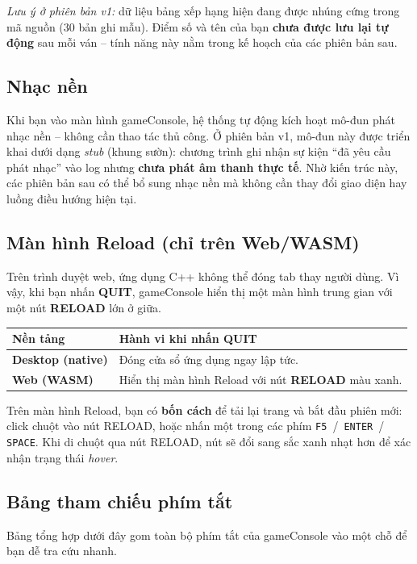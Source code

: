 \documentclass[12pt,a4paper]{article}
\begin{document}
\vspace{4pt}
\noindent\textit{Lưu ý ở phiên bản v1:} dữ liệu bảng xếp hạng hiện đang được nhúng cứng trong mã nguồn (30 bản ghi mẫu).
Điểm số và tên của bạn \textbf{chưa được lưu lại tự động} sau mỗi ván -- tính năng này nằm trong kế hoạch của các phiên bản sau.

\subsection{Nhạc nền}
Khi bạn vào màn hình gameConsole, hệ thống tự động kích hoạt mô-đun phát nhạc nền -- không cần thao tác thủ công.
Ở phiên bản v1, mô-đun này được triển khai dưới dạng \textit{stub} (khung sườn): chương trình ghi nhận sự kiện ``đã yêu cầu phát nhạc'' vào log nhưng \textbf{chưa phát âm thanh thực tế}.
Nhờ kiến trúc này, các phiên bản sau có thể bổ sung nhạc nền mà không cần thay đổi giao diện hay luồng điều hướng hiện tại.

\subsection{Màn hình Reload (chỉ trên Web/WASM)}
Trên trình duyệt web, ứng dụng C++ không thể đóng tab thay người dùng.
Vì vậy, khi bạn nhấn \textbf{QUIT}, gameConsole hiển thị một màn hình trung gian với một nút \textbf{RELOAD} lớn ở giữa.

\vspace{4pt}
\begin{tabularx}{\linewidth}{|l|X|}
    \hline
    \textbf{Nền tảng} & \textbf{Hành vi khi nhấn QUIT} \\
    \hline
    \textbf{Desktop (native)} & Đóng cửa sổ ứng dụng ngay lập tức. \\
    \hline
    \textbf{Web (WASM)}       & Hiển thị màn hình Reload với nút \textbf{RELOAD} màu xanh. \\
    \hline
\end{tabularx}

\vspace{4pt}
\noindent Trên màn hình Reload, bạn có \textbf{bốn cách} để tải lại trang và bắt đầu phiên mới: click chuột vào nút RELOAD, hoặc nhấn một trong các phím \texttt{F5} \,/\, \texttt{ENTER} \,/\, \texttt{SPACE}.
Khi di chuột qua nút RELOAD, nút sẽ đổi sang sắc xanh nhạt hơn để xác nhận trạng thái \textit{hover}.

\subsection{Bảng tham chiếu phím tắt}
Bảng tổng hợp dưới đây gom toàn bộ phím tắt của gameConsole vào một chỗ để bạn dễ tra cứu nhanh.
\end{document}
